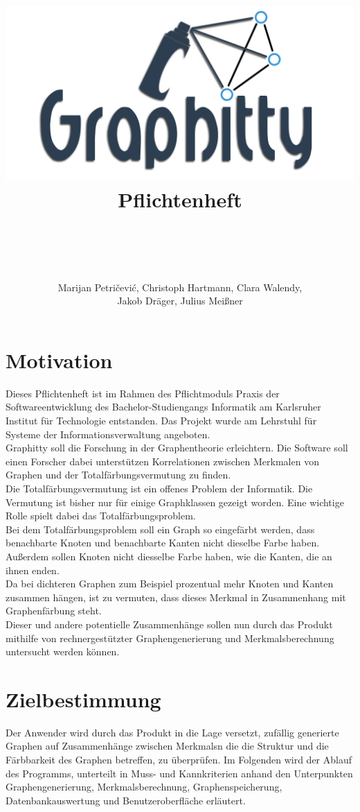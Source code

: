 \documentclass[13pt]{scrreprt}
\title{
	\includegraphics[scale=0.5,center]{OfficialLogo.png}
	\\
	Pflichtenheft
}
\author{\\ \\ \\ \\ Marijan Petričević, Christoph Hartmann, Clara Walendy,\\
	 Jakob Dräger, Julius Meißner}
\begin{document}
\maketitle

\tableofcontents

\chapter{Motivation}

Dieses Pflichtenheft ist im Rahmen des Pflichtmoduls Praxis der Softwareentwicklung des
Bachelor-Studiengangs Informatik am Karlsruher Institut für Technologie entstanden. Das
Projekt wurde am Lehrstuhl für Systeme der Informationsverwaltung angeboten.
\newline
\ \\
Graphitty soll die Forschung in der Graphentheorie erleichtern. Die Software soll einen Forscher dabei unterstützen Korrelationen zwischen Merkmalen von Graphen und der Totalfärbungsvermutung zu finden. \newline
\ \\
Die Totalfärbungsvermutung ist ein offenes Problem der Informatik. Die Vermutung ist bisher nur für einige Graphklassen gezeigt worden. Eine wichtige Rolle spielt dabei das Totalfärbungsproblem.\\
Bei dem Totalfärbungsproblem soll ein Graph so eingefärbt werden, dass benachbarte Knoten und  benachbarte Kanten nicht dieselbe Farbe haben. Außerdem sollen Knoten nicht diesselbe Farbe haben, wie die Kanten, die an ihnen enden.\\
Da bei dichteren Graphen zum Beispiel prozentual mehr Knoten und Kanten zusammen hängen, ist zu vermuten, dass dieses Merkmal in Zusammenhang mit Graphenfärbung steht. \\
Dieser und andere potentielle Zusammenhänge sollen nun durch das Produkt mithilfe von rechnergestützter Graphengenerierung und Merkmalsberechnung untersucht werden können.


\chapter{Zielbestimmung}

Der Anwender wird durch das Produkt in die Lage versetzt, zufällig generierte Graphen auf Zusammenhänge zwischen \Glspl{Merkmal}n die die Struktur und die Färbbarkeit des Graphen betreffen, zu überprüfen. Im Folgenden wird der Ablauf des Programms, unterteilt in Muss- und Kannkriterien anhand den Unterpunkten Graphengenerierung, \Gls{Merkmal}sberechnung, Graphenspeicherung, Datenbankauswertung und Benutzeroberfläche erläutert.
\end{document}
